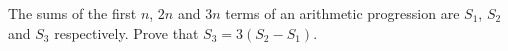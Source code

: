 The sums of the first $n$, $2n$ and $3n$ terms of an arithmetic progression are $S_1$, $S_2$ and $S_3$ respectively. Prove that $S_3=3(S_2-S_1)$.
